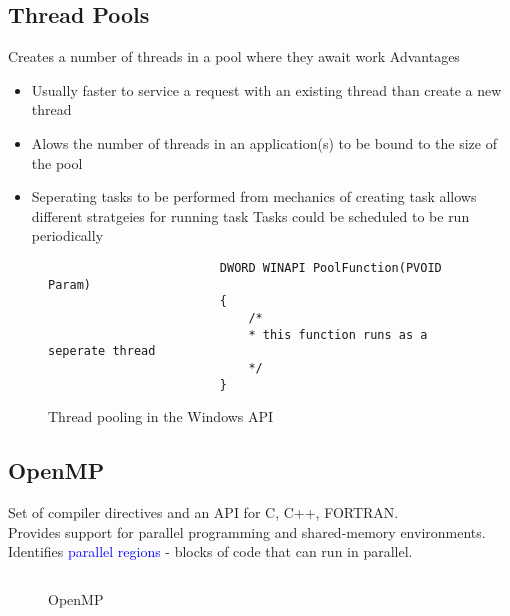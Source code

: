 \documentclass[oneside]{book}
\begin{document}
            \subsection{Thread Pools}
                Creates a number of threads in a pool where they await work
                Advantages
                \begin{itemize}
                    \item Usually faster to service a request with an existing thread than create a new thread
                    \item Alows the number of threads in an application(s) to be bound to the size of the pool
                    \item Seperating tasks to be performed from mechanics of creating task allows different stratgeies for
                    running task
                        \subitem Tasks could be scheduled to be run periodically
                \end{itemize}
                \begin{figure}[H]
                    \centering
                    \begin{verbatim}
                        DWORD WINAPI PoolFunction(PVOID Param)
                        {
                            /*
                            * this function runs as a seperate thread
                            */
                        }
                    \end{verbatim}
                    \caption{Thread pooling in the Windows API}
                \end{figure}
            \subsection*{OpenMP}
                Set of compiler directives and an API for C, C++, FORTRAN.\\
                Provides support for parallel programming and shared-memory environments.\\
                Identifies \textcolor{blue}{parallel regions} - blocks of code that can run in parallel.\\
                \begin{figure}[H]
                    \centering
                    \inputminted{c}{code/threads/openmp.c}
                    \caption{OpenMP}
                \end{figure}
\end{document}
